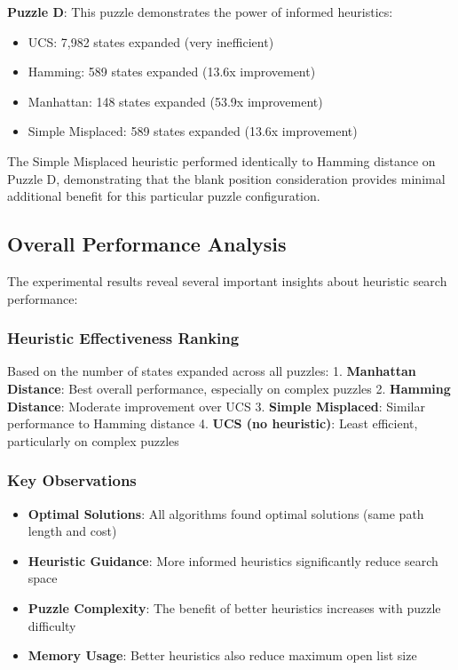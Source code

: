 \documentclass{article}
\begin{document}
\textbf{Puzzle D}: This puzzle demonstrates the power of informed heuristics:
\begin{itemize}
\item UCS: 7,982 states expanded (very inefficient)
\item Hamming: 589 states expanded (13.6x improvement)
\item Manhattan: 148 states expanded (53.9x improvement)
\item Simple Misplaced: 589 states expanded (13.6x improvement)
\end{itemize}

The Simple Misplaced heuristic performed identically to Hamming distance on Puzzle D, demonstrating that the blank position consideration provides minimal additional benefit for this particular puzzle configuration.

\subsection{Overall Performance Analysis}

The experimental results reveal several important insights about heuristic search performance:

\subsubsection{Heuristic Effectiveness Ranking}
Based on the number of states expanded across all puzzles:
1. \textbf{Manhattan Distance}: Best overall performance, especially on complex puzzles
2. \textbf{Hamming Distance}: Moderate improvement over UCS
3. \textbf{Simple Misplaced}: Similar performance to Hamming distance
4. \textbf{UCS (no heuristic)}: Least efficient, particularly on complex puzzles

\subsubsection{Key Observations}
\begin{itemize}
\item \textbf{Optimal Solutions}: All algorithms found optimal solutions (same path length and cost)
\item \textbf{Heuristic Guidance}: More informed heuristics significantly reduce search space
\item \textbf{Puzzle Complexity}: The benefit of better heuristics increases with puzzle difficulty
\item \textbf{Memory Usage}: Better heuristics also reduce maximum open list size
\end{itemize}
\end{document}
